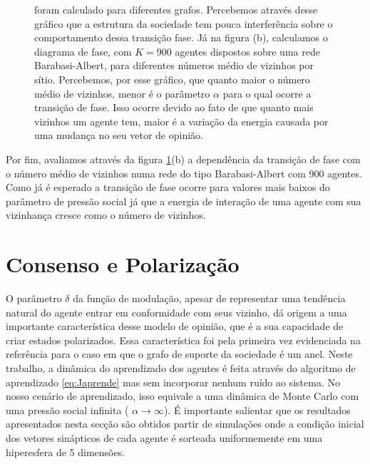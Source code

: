\begin{figure}
{        foram calculado para diferentes grafos. Percebemos através desse
        gráfico que a estrutura da sociedade tem pouca interferência
        sobre o comportamento dessa transição fase. Já na figura (b),
        calculamos o diagrama de fase, com $K=900$ agentes dispostos sobre
        uma rede Barabasi-Albert, para diferentes números médio de vizinhos
        por sítio. Percebemos, por esse gráfico, que quanto maior o número
        médio de vizinhos, menor é o parâmetro $\alpha$ para o qual ocorre
        a transição de fase. Isso ocorre devido ao fato de que quanto mais
        vizinhos um agente tem, maior é a variação da energia causada
        por uma mudança no seu vetor de opinião.
    } 
    \label{fig:DiagFaseDif}
\end{figure}

Por fim, avaliamos através da figura \ref{fig:DiagFaseDif}(b) a
dependência da transição de fase com o número médio de vizinhos numa rede
do tipo Barabasi-Albert com 900 agentes. Como já é esperado a transição
de fase ocorre para valores mais baixos do parâmetro de pressão social
já que a energia de interação de uma agente com sua vizinhança cresce
como o número de vizinhos.

\newpage
\section{Consenso e Polarização} %

O parâmetro $\delta$ da função de modulação, apesar de representar uma
tendência natural do agente entrar em conformidade com seus vizinho, dá
origem a uma importante característica desse modelo de opinião, que é a
sua capacidade de criar estados polarizados. Essa característica foi pela
primeira vez evidenciada na referência  para o caso em
que o grafo de suporte da sociedade é um anel. Neste trabalho, a dinâmica
do aprendizado dos agentes é feita através do algoritmo de aprendizado
\eqref{eq:Japrende} mas sem incorporar nenhum ruído ao sistema. No nosso
cenário de aprendizado, isso equivale a uma dinâmica de Monte Carlo com
uma pressão social infinita ( $\alpha \rightarrow \infty $). É importante
salientar que os resultados apresentados nesta secção são obtidos partir
de simulações onde a condição inicial dos vetores sinápticos de cada agente
é sorteada uniformemente em uma hiperesfera de 5 dimensões.

